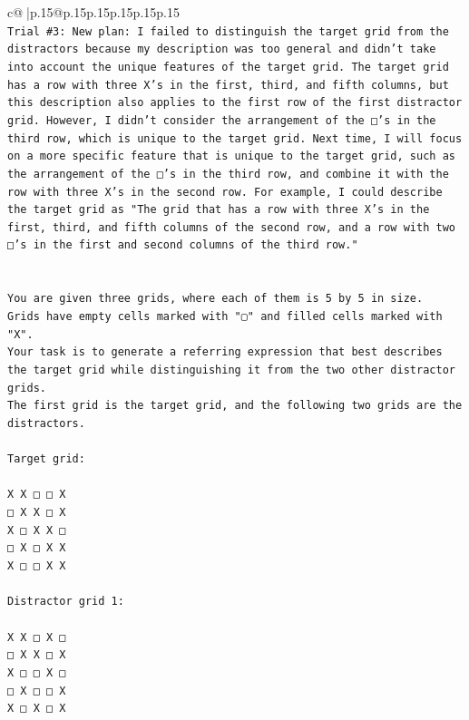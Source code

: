 \documentclass{article}
\begin{document}
{\begin{supertabular}{c@{$\;$}|p{.15\linewidth}@{}p{.15\linewidth}p{.15\linewidth}p{.15\linewidth}p{.15\linewidth}p{.15\linewidth}}
{{{\\ 
\texttt{Trial \#3: New plan: I failed to distinguish the target grid from the distractors because my description was too general and didn't take into account the unique features of the target grid. The target grid has a row with three X's in the first, third, and fifth columns, but this description also applies to the first row of the first distractor grid. However, I didn't consider the arrangement of the □'s in the third row, which is unique to the target grid. Next time, I will focus on a more specific feature that is unique to the target grid, such as the arrangement of the □'s in the third row, and combine it with the row with three X's in the second row. For example, I could describe the target grid as "The grid that has a row with three X's in the first, third, and fifth columns of the second row, and a row with two □'s in the first and second columns of the third row."} \\
\\ 
\\ 
\texttt{You are given three grids, where each of them is 5 by 5 in size.} \\
\texttt{Grids have empty cells marked with "▢" and filled cells marked with "X".} \\
\texttt{Your task is to generate a referring expression that best describes the target grid while distinguishing it from the two other distractor grids.} \\
\texttt{The first grid is the target grid, and the following two grids are the distractors.} \\
\\ 
\texttt{Target grid:} \\
\\ 
\texttt{X X □ □ X} \\
\texttt{□ X X □ X} \\
\texttt{X □ X X □} \\
\texttt{□ X □ X X} \\
\texttt{X □ □ X X} \\
\\ 
\texttt{Distractor grid 1:} \\
\\ 
\texttt{X X □ X □} \\
\texttt{□ X X □ X} \\
\texttt{X □ □ X □} \\
\texttt{□ X □ □ X} \\
\texttt{X □ X □ X} \\
\\ 
}}}
\end{supertabular}}
\end{document}
